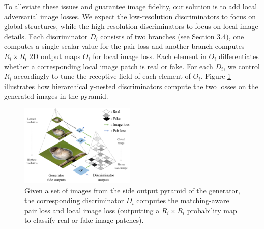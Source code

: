 \documentclass[10pt,twocolumn,letterpaper]{article}
\begin{document}
To alleviate these issues and guarantee image fidelity, our solution is to add local adversarial image losses.
%
We expect the low-resolution discriminators to focus on global structures, while the high-resolution discriminators to focus on local image details.
Each discriminator $D_i$ consists of two branches (see Section 3.4), one computes a single scalar value for the pair loss and another branch computes  $R_i{\times}R_i$ 2D output maps $O_i$ for local image loss.
Each element in $O_i$ differentiates whether a corresponding local image patch is real or fake.
For each $D_i$, we control $R_i$ accordingly to tune the receptive field of each element of $O_i$. 
Figure \ref{fig:loss} illustrates how hierarchically-nested discriminators compute the two losses on the generated images in the pyramid. 



\begin{figure}[t]
    \centering
    \includegraphics[width=0.49\textwidth]{figure/loss.pdf}
    \vspace{-.7cm}
    \caption{Given a set of images from the side output pyramid of the generator, the corresponding discriminator $D_i$ computes the matching-aware pair loss and local image loss (outputting a $R_i{\times}R_i$ probability map to classify real or fake image patches). }  \vspace{-.2cm}
    \label{fig:loss}
\end{figure}
\end{document}

